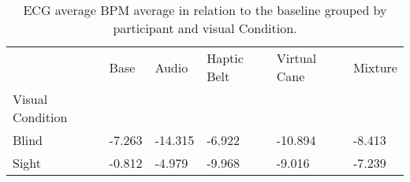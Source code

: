 
\begin{table}[!htb]
\centering
\caption{ECG average BPM average in relation to the baseline grouped by participant and visual Condition.}
\label{tab:ecg_bpm_average_group}
\begin{tabular}{llllll}
\toprule
{} &   Base &   Audio &  Haptic Belt &  Virtual Cane &  Mixture \\
Visual Condition &        &         &              &               &          \\
\midrule
Blind            & -7.263 & -14.315 &       -6.922 &       -10.894 &   -8.413 \\
Sight            & -0.812 &  -4.979 &       -9.968 &        -9.016 &   -7.239 \\
\bottomrule
\end{tabular}
\end{table}

